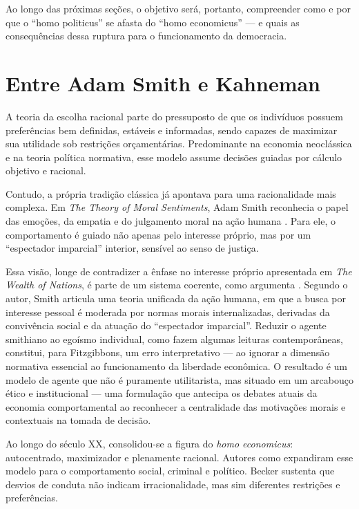 Ao longo das próximas seções, o objetivo será, portanto, compreender como e por que o ``homo politicus'' se afasta do ``homo economicus'' — e quais as consequências dessa ruptura para o funcionamento da democracia.

\section{Entre Adam Smith e Kahneman} %

A teoria da escolha racional parte do pressuposto de que os indivíduos possuem preferências bem definidas, estáveis e informadas, sendo capazes de maximizar sua utilidade sob restrições orçamentárias. Predominante na economia neoclássica e na teoria política normativa, esse modelo assume decisões guiadas por cálculo objetivo e racional.

Contudo, a própria tradição clássica já apontava para uma racionalidade mais complexa. Em \textit{The Theory of Moral Sentiments}, Adam Smith reconhecia o papel das emoções, da empatia e do julgamento moral na ação humana \cite{smith1759-theory-of-moral-sentiments}. Para ele, o comportamento é guiado não apenas pelo interesse próprio, mas por um ``espectador imparcial'' interior, sensível ao senso de justiça.

Essa visão, longe de contradizer a ênfase no interesse próprio apresentada em \textit{The Wealth of Nations}, é parte de um sistema coerente, como argumenta . Segundo o autor, Smith articula uma teoria unificada da ação humana, em que a busca por interesse pessoal é moderada por normas morais internalizadas, derivadas da convivência social e da atuação do ``espectador imparcial''. Reduzir o agente smithiano ao egoísmo individual, como fazem algumas leituras contemporâneas, constitui, para Fitzgibbons, um erro interpretativo — ao ignorar a dimensão normativa essencial ao funcionamento da liberdade econômica. O resultado é um modelo de agente que não é puramente utilitarista, mas situado em um arcabouço ético e institucional — uma formulação que antecipa os debates atuais da economia comportamental ao reconhecer a centralidade das motivações morais e contextuais na tomada de decisão.

Ao longo do século XX, consolidou-se a figura do \textit{homo economicus}: autocentrado, maximizador e plenamente racional. Autores como  expandiram esse modelo para o comportamento social, criminal e político. Becker sustenta que desvios de conduta não indicam irracionalidade, mas sim diferentes restrições e preferências.


